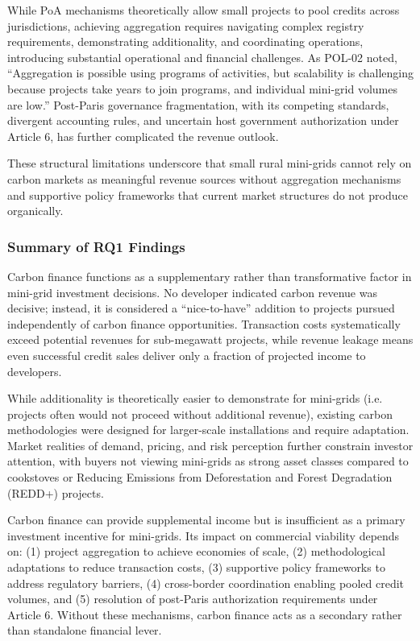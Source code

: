 While PoA mechanisms theoretically allow small projects to pool credits across jurisdictions, achieving aggregation requires navigating complex registry requirements, demonstrating additionality, and coordinating operations, introducing substantial operational and financial challenges. As POL-02 noted, ``Aggregation is possible using programs of activities, but scalability is challenging because projects take years to join programs, and individual mini-grid volumes are low.'' Post-Paris governance fragmentation, with its competing standards, divergent accounting rules, and uncertain host government authorization under Article 6, has further complicated the revenue outlook.~\cite{ahonen-governance}

These structural limitations underscore that small rural mini-grids cannot rely on carbon markets as meaningful revenue sources without aggregation mechanisms and supportive policy frameworks that current market structures do not produce organically.

\subsubsection{Summary of RQ1 Findings}
Carbon finance functions as a supplementary rather than transformative factor in mini-grid investment decisions. No developer indicated carbon revenue was decisive; instead, it is considered a ``nice-to-have'' addition to projects pursued independently of carbon finance opportunities. Transaction costs systematically exceed potential revenues for sub-megawatt projects, while revenue leakage means even successful credit sales deliver only a fraction of projected income to developers.~\cite{power-africa-credits}

While additionality is theoretically easier to demonstrate for mini-grids (i.e. projects often would not proceed without additional revenue), existing carbon methodologies were designed for larger-scale installations and require adaptation. Market realities of demand, pricing, and risk perception further constrain investor attention, with buyers not viewing mini-grids as strong asset classes compared to cookstoves or Reducing Emissions from Deforestation and Forest Degradation (REDD+) projects.

Carbon finance can provide supplemental income but is insufficient as a primary investment incentive for mini-grids. Its impact on commercial viability depends on: (1) project aggregation to achieve economies of scale, (2) methodological adaptations to reduce transaction costs, (3) supportive policy frameworks to address regulatory barriers, (4) cross-border coordination enabling pooled credit volumes, and (5) resolution of post-Paris authorization requirements under Article 6. Without these mechanisms, carbon finance acts as a secondary rather than standalone financial lever.

